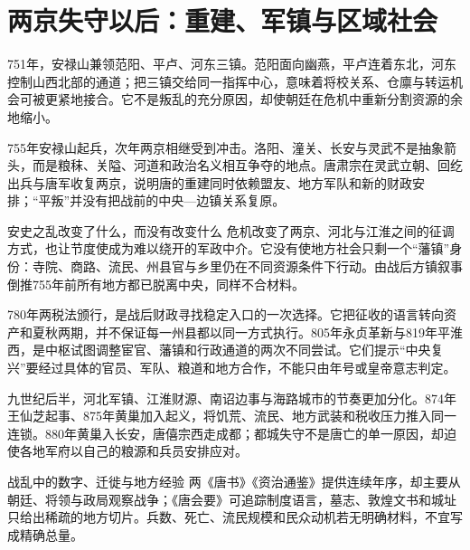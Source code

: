 \section{两京失守以后：重建、军镇与区域社会}
\label{sec:late-tang-curated-chronicle}

751年，安禄山兼领范阳、平卢、河东三镇。范阳面向幽燕，平卢连着东北，河东控制山西北部的通道；把三镇交给同一指挥中心，意味着将校关系、仓廪与转运机会可被更紧地接合。它不是叛乱的充分原因，却使朝廷在危机中重新分割资源的余地缩小。

755年安禄山起兵，次年两京相继受到冲击。洛阳、潼关、长安与灵武不是抽象箭头，而是粮秣、关隘、河道和政治名义相互争夺的地点。唐肃宗在灵武立朝、回纥出兵与唐军收复两京，说明唐的重建同时依赖盟友、地方军队和新的财政安排；“平叛”并没有把战前的中央—边镇关系复原。

\begin{turningpoint}{安史之乱改变了什么，而没有改变什么}
危机改变了两京、河北与江淮之间的征调方式，也让节度使成为难以绕开的军政中介。它没有使地方社会只剩一个“藩镇”身份：寺院、商路、流民、州县官与乡里仍在不同资源条件下行动。由战后方镇叙事倒推755年前所有地方都已脱离中央，同样不合材料。
\end{turningpoint}

780年两税法颁行，是战后财政寻找稳定入口的一次选择。它把征收的语言转向资产和夏秋两期，并不保证每一州县都以同一方式执行。805年永贞革新与819年平淮西，是中枢试图调整宦官、藩镇和行政通道的两次不同尝试。它们提示“中央复兴”要经过具体的官员、军队、粮道和地方合作，不能只由年号或皇帝意志判定。

九世纪后半，河北军镇、江淮财源、南诏边事与海路城市的节奏更加分化。874年王仙芝起事、875年黄巢加入起义，将饥荒、流民、地方武装和税收压力推入同一连锁。880年黄巢入长安，唐僖宗西走成都；都城失守不是唐亡的单一原因，却迫使各地军府以自己的粮源和兵员安排应对。

\begin{sourcenote}{战乱中的数字、迁徙与地方经验}
两《唐书》《资治通鉴》提供连续年序，却主要从朝廷、将领与政局观察战争；《唐会要》可追踪制度语言，墓志、敦煌文书和城址只给出稀疏的地方切片。兵数、死亡、流民规模和民众动机若无明确材料，不宜写成精确总量。
\end{sourcenote}


